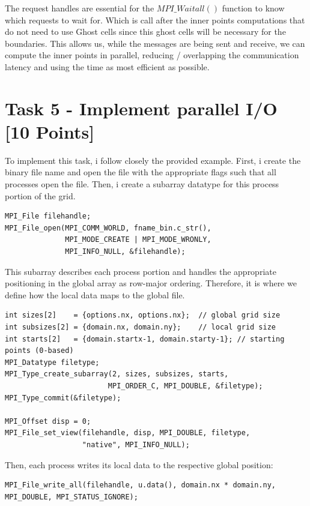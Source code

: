 \documentclass[unicode,11pt,a4paper,oneside,numbers=endperiod,openany]{scrartcl}
\begin{document}
The request handles are essential for the $MPI\_Waitall()$ function to know which requests to wait for. 
Which is call after the inner points computations that do not need to use Ghost cells since this ghost cells
will be necessary for the boundaries. This allows us, while the messages are being sent and receive, we can compute the
inner points in parallel, reducing / overlapping the communication latency and using the time as most efficient as possible. 


\section{Task 5 - Implement parallel I/O [10 Points]}
To implement this task, i follow closely the provided example. 
First, i create the binary file name and open the file with the appropriate flags such
that all processes open the file. Then, i create a subarray datatype for this process portion of the grid.

\begin{verbatim}
MPI_File filehandle;
MPI_File_open(MPI_COMM_WORLD, fname_bin.c_str(), 
              MPI_MODE_CREATE | MPI_MODE_WRONLY,
              MPI_INFO_NULL, &filehandle);
\end{verbatim}

This subarray describes each process portion and handles the appropriate positioning in the global array as row-major
ordering. Therefore, it is where we define how the local data maps to the global file.

\begin{verbatim}
int sizes[2]    = {options.nx, options.nx};  // global grid size
int subsizes[2] = {domain.nx, domain.ny};    // local grid size
int starts[2]   = {domain.startx-1, domain.starty-1}; // starting points (0-based)
MPI_Datatype filetype;
MPI_Type_create_subarray(2, sizes, subsizes, starts, 
                        MPI_ORDER_C, MPI_DOUBLE, &filetype);
MPI_Type_commit(&filetype);

MPI_Offset disp = 0;
MPI_File_set_view(filehandle, disp, MPI_DOUBLE, filetype, 
                  "native", MPI_INFO_NULL);
\end{verbatim}

Then, each process writes its local data to the respective global position:

\begin{verbatim}
MPI_File_write_all(filehandle, u.data(), domain.nx * domain.ny, 
MPI_DOUBLE, MPI_STATUS_IGNORE);
\end{verbatim}
\end{document}
